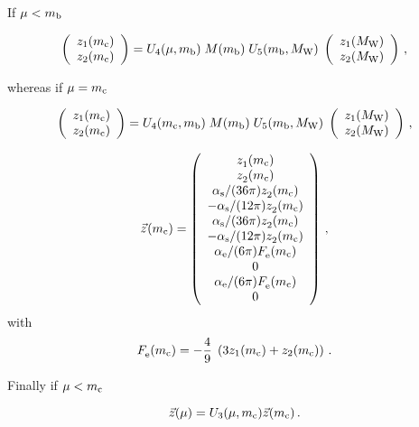 If $\mu<m_{\mathrm b}$ 

\begin{equation}
\left( \begin{array}{ll} z_1(m_{\mathrm c}) \\ z_2(m_{\mathrm c}) \end{array} \right) =
U_4(\mu,m_{\mathrm b}) \; M(m_{\mathrm b}) \; U_5(m_{\mathrm b},M_{\mathrm W}) \;
\left( \begin{array}{ll} z_1(M_{\mathrm W}) \\ z_2(M_{\mathrm W}) \end{array} \right) \, ,
\label{eq:zmc12}
\end{equation}

whereas if $\mu=m_{\mathrm c}$ 

\begin{equation}
\left( \begin{array}{ll} z_1(m_{\mathrm c}) \\ z_2(m_{\mathrm c}) \end{array} \right) =
U_4(m_{\mathrm c},m_{\mathrm b}) \; M(m_{\mathrm b}) \; U_5(m_{\mathrm b},M_{\mathrm W}) \;
\left( \begin{array}{ll} z_1(M_{\mathrm W}) \\ z_2(M_{\mathrm W}) \end{array} \right) \, ,
\label{eq:zmc12}
\end{equation}

\begin{equation}
\vec{z}^{\rm }(m_{\mathrm c}) =
\left( \begin{array}{c}
z_1^{\rm }(m_{\mathrm c}) \\ z_2^{\rm }(m_{\mathrm c}) \\
\alpha_{\rm s}/(36\pi) z_2^{\rm }(m_{\mathrm c}) \\
-\alpha_{\rm s}/(12 \pi) z_2^{\rm }(m_{\mathrm c}) \\
\alpha_{\rm s}/(36\pi) z_2^{\rm }(m_{\mathrm c}) \\
-\alpha_{\rm s}/(12 \pi) z_2^{\rm }(m_{\mathrm c}) \\
\alpha_{\rm e}/(6\pi) F_{\rm e}^{\rm }(m_{\mathrm c}) \\  0  \\
\alpha_{\rm e}/(6\pi) F_{\rm e}^{\rm }(m_{\mathrm c}) \\  0
\end{array} \right) \, ,
\label{eq:zmc:1010}
\end{equation}
with
\begin{equation}
F_{\rm e}^{\rm }(m_{\mathrm c}) =
-\frac{4}{9} \; \left( 3 z_1(m_{\mathrm c}) + z_2(m_{\mathrm c}) \right) \, .
\label{eq:Femc}
\end{equation}

Finally if $\mu<m_{\mathrm c}$

\begin{equation}
\vec{z}(\mu) = U_3(\mu,m_{\mathrm c}) \vec{z}(m_{\mathrm c}) \, .
\label{eq:WCz}
\end{equation}

